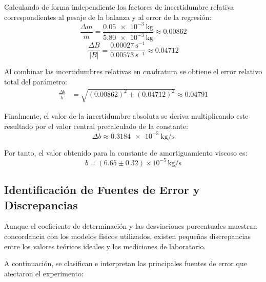 Calculando de forma independiente los factores de incertidumbre relativa correspondientes al pesaje de la balanza y al error de la regresión:
\begin{equation}
\frac{\Delta m}{m} = \frac{\SI{0.05e-3}{\kilogram}}{\SI{5.80e-3}{\kilogram}} \approx 0.00862
\end{equation}
\begin{equation}
\frac{\Delta B}{|B|} = \frac{\SI{0.00027}{\second^{-1}}}{\SI{0.00573}{\second^{-1}}} \approx 0.04712
\end{equation}

Al combinar las incertidumbres relativas en cuadratura se obtiene el error relativo total del parámetro:
\begin{equation}
\begin{split}
\frac{\Delta b}{b} &= \sqrt{(0.00862)^2 + (0.04712)^2} \approx 0.04791
\end{split}
\end{equation}

Finalmente, el valor de la incertidumbre absoluta se deriva multiplicando este resultado por el valor central precalculado de la constante:
\begin{equation}
\Delta b \approx \SI{0.3184e-5}{\kilogram\per\second}
\end{equation}

Por tanto, el valor obtenido para la constante de amortiguamiento viscoso es:
\begin{equation}
b = (6.65 \pm 0.32) \times 10^{-5}\,\si{\kilogram\per\second}
\end{equation}

\subsection{Identificación de Fuentes de Error y Discrepancias}

Aunque el coeficiente de determinación y las desviaciones porcentuales muestran concordancia con los modelos físicos utilizados, existen pequeñas discrepancias entre los valores teóricos ideales y las mediciones de laboratorio.

A continuación, se clasifican e interpretan las principales fuentes de error que afectaron el experimento:

